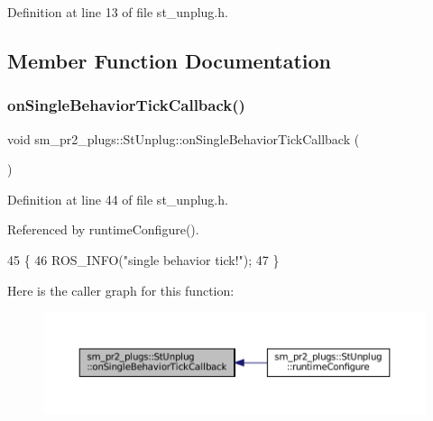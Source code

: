 Definition at line 13 of file st\+\_\+unplug.\+h.



\subsection{Member Function Documentation}
\mbox{\label{structsm__pr2__plugs_1_1StUnplug_a2f48107152c97948f7925c6d6225b4bf}} 
\subsubsection{\texorpdfstring{on\+Single\+Behavior\+Tick\+Callback()}{onSingleBehaviorTickCallback()}}
{\footnotesize\ttfamily void sm\+\_\+pr2\+\_\+plugs\+::\+St\+Unplug\+::on\+Single\+Behavior\+Tick\+Callback (\begin{DoxyParamCaption}{ }\end{DoxyParamCaption})\hspace{0.3cm}{\ttfamily [inline]}}



Definition at line 44 of file st\+\_\+unplug.\+h.



Referenced by runtime\+Configure().


\begin{DoxyCode}
45     \{
46         ROS\_INFO(\textcolor{stringliteral}{"single behavior tick!"});
47     \}
\end{DoxyCode}
Here is the caller graph for this function\+:
\nopagebreak
\begin{figure}[H]
\begin{center}
\leavevmode
\includegraphics[width=350pt]{structsm__pr2__plugs_1_1StUnplug_a2f48107152c97948f7925c6d6225b4bf_icgraph}
\end{center}
\end{figure}
\mbox{\label{structsm__pr2__plugs_1_1StUnplug_ac3f670b50be1fcd8e3dc0f28f5fafab9}} 
